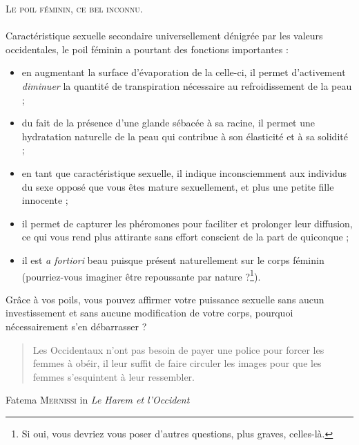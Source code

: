 \documentclass[a4paper,11pt]{article}
\begin{document}
\Huge\textsc{Le poil féminin, ce bel inconnu.}\\
\\
Caractéristique sexuelle secondaire universellement dénigrée par les valeurs
occidentales, le poil féminin a pourtant des fonctions importantes : \\

\begin{itemize}
\item en augmentant la surface d’évaporation de la celle-ci, il permet
d’activement \emph{diminuer} la quantité de transpiration nécessaire au
refroidissement de la peau ;
\item du fait de la présence d’une glande sébacée à sa racine, il permet une
hydratation naturelle de la peau qui contribue à son élasticité et à sa
solidité ;
\item en tant que caractéristique sexuelle, il indique inconsciemment aux
individus du sexe opposé que vous êtes mature sexuellement, et plus une petite
fille innocente ;
\item il permet de capturer les phéromones pour faciliter et prolonger leur
diffusion, ce qui vous rend plus attirante sans effort conscient de la part de
quiconque ;
\item il est \emph{a fortiori} beau puisque présent naturellement sur le corps
féminin (pourriez-vous imaginer être repoussante par nature ?\footnote{Si oui,
vous devriez vous poser d’autres questions, plus graves, celles-là.}).
\end{itemize}

Grâce à vos poils, vous pouvez affirmer votre puissance sexuelle sans aucun
investissement et sans aucune modification de votre corps, pourquoi
nécessairement s’en débarrasser ?

\begin{quote}
Les Occidentaux n'ont pas besoin de payer une police pour forcer les femmes à
obéir, il leur suffit de faire circuler les images pour que les femmes
s'esquintent à leur ressembler.
\end{quote}
Fatema \textsc{Mernissi} in \emph{Le Harem et l'Occident}
\end{document}
